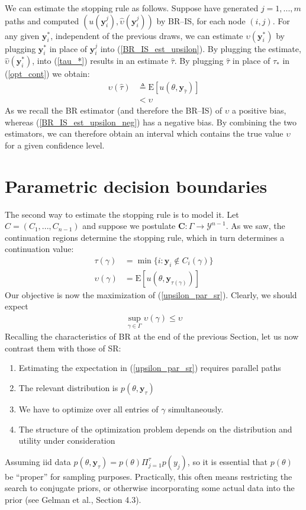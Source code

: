\documentclass{article}
\begin{document}
We can estimate the stopping rule as follows. Suppose have generated
$j=1,...,m$ paths and computed
$(u(\mathbf{y}_i^j),\hat\upsilon(\mathbf{y}_i^j))$ by BR--IS, for
each node $(i,j)$. For any given $\mathbf{y}_i^*$, independent of
the previous draws, we can estimate $\upsilon(\mathbf{y}_i^*)$ by
plugging $\mathbf{y}_i^*$ in place of $\mathbf{y}_i^j$ into
(\ref{BR_IS_est_upsilon}). By plugging the estimate,
$\hat\upsilon(\mathbf{y}_i^*)$, into (\ref{tau_*}) results in an
estimate $\hat\tau$. By plugging $\hat\tau$ in place of $\tau_*$ in
(\ref{opt_cont}) we obtain:
\begin{align}\label{BR_IS_est_upsilon_neg}
\upsilon(\hat \tau)&\triangleq
\mathrm{E}[u(\theta,\mathbf{y}_{\hat\tau})]\\&< \upsilon
\end{align}As we recall the BR estimator (and therefore the
BR--IS) of $\upsilon$ a positive bias, whereas
(\ref{BR_IS_est_upsilon_neg}) has a negative bias. By combining the
two estimators, we can therefore obtain an interval which contains
the true value $\upsilon$ for a given confidence level.

\section{Parametric decision boundaries}\label{sec:param}

The second way to estimate the stopping rule is to model it. Let
$C=(C_1,...,C_{n-1})$ and suppose we postulate $\mathbf{C}:\Gamma
\rightarrow\boldsymbol{\mathcal{Y}}^{n-1}$. As we saw, the
continuation regions determine the stopping rule, which in turn
determines a continuation value:\begin{align}
\tau(\gamma)&=\min\{i: \mathbf{y}_i \notin C_i(\gamma)\}\\
\label{upsilon_par_sr} \upsilon(\gamma)&=
\mathrm{E}[u(\theta,\mathbf{y}_{\tau(\gamma)})]
\end{align}Our objective is now the maximization of
(\ref{upsilon_par_sr}). Clearly, we should expect
 \begin{align}\label{sup_upsilon_par_sr}
\sup_{\gamma\in\Gamma} \upsilon(\gamma)\leq \upsilon
\end{align}
Recalling the characteristics of BR at the end of the previous
Section, let us now contrast them with those of SR:
\begin{enumerate}
\item Estimating the expectation in (\ref{upsilon_par_sr}) requires parallel
paths
\item The relevant distribution is $p(\theta,\mathbf{y}_{\tau})$
\item We have to optimize over all entries of $\gamma$ simultaneously.
\item The structure of the optimization problem depends on the
distribution and utility under consideration
\end{enumerate}Assuming iid data
$p(\theta,\mathbf{y}_\tau)=p(\theta)\Pi_{j=1}^{\tau}p(y_j)$, so it
is essential that $p(\theta)$ be ``proper'' for sampling purposes.
Practically, this often means restricting the search to conjugate
priors, or otherwise incorporating some actual data into the prior
(see Gelman et al., Section 4.3).
\end{document}
